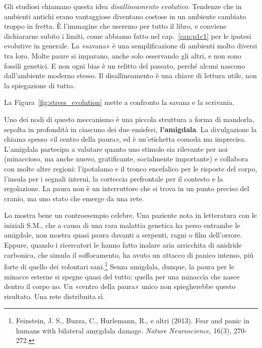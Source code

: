 Gli studiosi chiamano questa idea \textit{disallineamento evolutivo}. Tendenze che in ambienti antichi erano vantaggiose diventano costose in un ambiente cambiato troppo in fretta. È l'immagine che useremo per tutto il libro, e conviene dichiararne subito i limiti, come abbiamo fatto nel cap.~\ref{cap:p1c1} per le ipotesi evolutive in generale. La «savana» è una semplificazione di ambienti molto diversi tra loro. Molte paure si imparano, anche solo osservando gli altri, e non sono fossili genetici. E non ogni bias è un relitto del passato, perché alcuni nascono dall'ambiente moderno stesso. Il disallineamento è una chiave di lettura utile, non la spiegazione di tutto.

La Figura~\ref{fig:stress_evolution} mette a confronto la savana e la scrivania.


Uno dei nodi di questo meccanismo è una piccola struttura a forma di mandorla, sepolta in profondità in ciascuno dei due emisferi, \textbf{l'amigdala}. La divulgazione la chiama spesso «il centro della paura», ed è un'etichetta comoda ma imprecisa. L'amigdala partecipa a valutare quanto uno stimolo sia rilevante per noi (minaccioso, ma anche nuovo, gratificante, socialmente importante) e collabora con molte altre regioni: l'ipotalamo e il tronco encefalico per le risposte del corpo, l'insula per i segnali interni, la corteccia prefrontale per il contesto e la regolazione. La paura non è un interruttore che si trova in un punto preciso del cranio, ma uno stato che emerge da una rete.

Lo mostra bene un controesempio celebre. Una paziente nota in letteratura con le iniziali S.M., che a causa di una rara malattia genetica ha perso entrambe le amigdale, non mostra quasi paura davanti a serpenti, ragni o film dell'orrore. Eppure, quando i ricercatori le hanno fatto inalare aria arricchita di anidride carbonica, che simula il soffocamento, ha avuto un attacco di panico intenso, più forte di quello dei volontari sani.\footnote{Feinstein, J. S., Buzza, C., Hurlemann, R., e altri (2013). Fear and panic in humans with bilateral amygdala damage. \textit{Nature Neuroscience}, 16(3), 270-272.} Senza amigdala, dunque, la paura per le minacce esterne si spegne quasi del tutto; quella per una minaccia che nasce dentro il corpo no. Un «centro della paura» unico non spiegherebbe questo risultato. Una rete distribuita sì.

